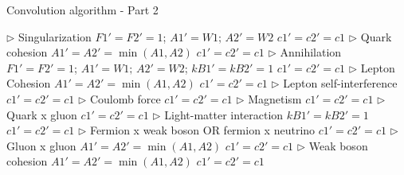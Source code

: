 \documentclass[12pt,english]{article}
\begin{document}
\begin{algorithm}
    \caption{Convolution algorithm - Part 2}
    \label{algo:convolution2}
    \small
    \begin{algorithmic}[1]
         
            \State $\triangleright$ Singularization
            \State $F1'=F2'=1$; $A1'=W1;\,A2'=W2$
            \State $c1'=c2'=c1$ 
         
                \State $\triangleright$ Quark cohesion
                \State $A1'=A2'=\min(A1, A2)$
                \State $c1'=c2'=c1$  
                \State $\triangleright$ Annihilation
                \State $F1'=F2'=1$; $A1'=W1;\,A2'=W2$; $kB1'=kB2'=1$
                \State $c1'=c2'=c1$  
                    \State $\triangleright$ Lepton Cohesion
                    \State $A1'=A2'=\min(A1, A2)$
                    \State $c1'=c2'=c1$  
                    \State $\triangleright$ Lepton self-interference
                    \State $c1'=c2'=c1$  
                \EndIf    
                \State $\triangleright$ Coulomb force
                \State $c1'=c2'=c1$  
                \State $\triangleright$ Magnetism
                \State $c1'=c2'=c1$  
            \EndIf   
         
                \State $\triangleright$ Quark x gluon
                \State $c1'=c2'=c1$  
                    \State $\triangleright$ Light-matter interaction
                    \State $kB1'=kB2'=1$
                    \State $c1'=c2'=c1$  
                    \State $\triangleright$ Fermion x weak boson OR fermion x neutrino
                    \State $c1'=c2'=c1$  
                \EndIf        
            \EndIf   
         
                \State $\triangleright$ Gluon x gluon
                \State $A1'=A2'=\min(A1, A2)$
                \State $c1'=c2'=c1$  
                \State $\triangleright$ Weak boson cohesion
                \State $A1'=A2'=\min(A1, A2)$
                \State $c1'=c2'=c1$  
            \EndIf   
        \EndIf   
    \end{algorithmic}
\end{algorithm}
\end{document}
